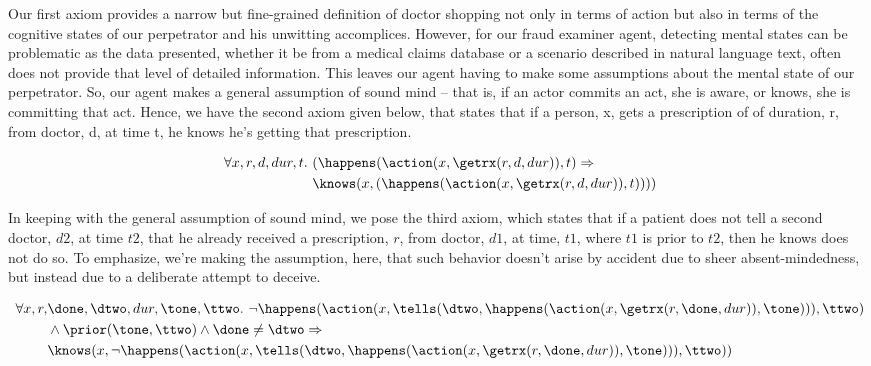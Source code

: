 Our first axiom provides a narrow but fine-grained definition of doctor shopping not only in terms of action but also in terms of the cognitive states of our perpetrator and his unwitting accomplices.  However, for our fraud examiner agent, detecting mental states can be problematic as the data presented, whether it be from a medical claims database or a scenario described in natural language text, often does not provide that level of detailed information.  This leaves our agent having to make some assumptions about the mental state of our perpetrator.  So, our agent makes a general assumption of sound mind -- that is, if an actor commits an act, she is aware, or knows, she is committing that act.  Hence, we have the second axiom given below, that states that if a person, x, gets a prescription of of duration, r, from doctor, d, at time t, he knows he's getting that prescription.


\begin{footnotesize}
\begin{align*}
[A2] \ \forall x, r, d, dur, t . \ &(\happens(\action(x, \getrx(r, d, dur)), t) \Rightarrow \\
& \knows(x,(\happens(\action(x,\getrx(r,d,dur)), t))))
\end{align*}
\end{footnotesize}

In keeping with the general assumption of sound mind, we pose the third axiom, which states that if a patient does not tell a second doctor, $d2$, at time $t2$, that he already received a prescription, $r$, from doctor, $d1$, at time, $t1$, where $t1$ is prior to $t2$, then he knows does not do so.  To emphasize, we're making the assumption, here, that such behavior doesn't arise by accident due to sheer absent-mindedness, but instead due to a deliberate attempt to deceive.


\begin{footnotesize}
\begin{align*}
[A3] \ \forall x, r, &\done, \dtwo, dur, \tone, \ttwo . \ \neg \happens(\action(x,\tells(\dtwo,\happens(\action(x,\getrx(r,\done,dur)),\tone))),\ttwo) \\
& \wedge \prior(\tone,\ttwo) \wedge \done \neq \dtwo \Rightarrow \\
& \knows(x, \neg \happens(\action(x,\tells(\dtwo,\happens(\action(x,\getrx(r,\done,dur)),\tone))),\ttwo))
\end{align*}
\end{footnotesize}


